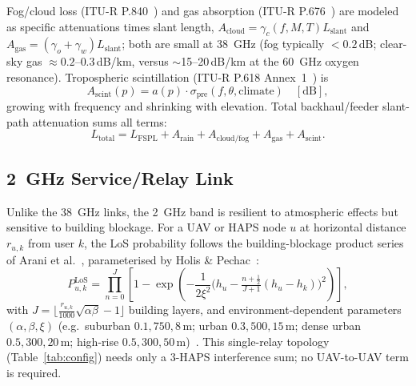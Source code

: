\documentclass[]{ieeeaccess}
\begin{document}
Fog/cloud loss (ITU-R P.840~\cite{itu_p840}) and gas absorption (ITU-R P.676~\cite{itu_p676}) are modeled as specific attenuations times slant length, $A_\mathrm{cloud}=\gamma_c(f,M,T)L_\mathrm{slant}$ and $A_\mathrm{gas}=(\gamma_o+\gamma_w)L_\mathrm{slant}$; both are small at 38~GHz (fog typically $<0.2$\,dB; clear-sky gas $\approx0.2$--$0.3$\,dB/km, versus $\sim$15--20\,dB/km at the 60~GHz oxygen resonance). Tropospheric scintillation (ITU-R P.618 Annex~1~\cite{itu_p618}) is
\begin{equation}
A_\mathrm{scint}(p) = a(p)\cdot\sigma_\mathrm{pre}(f,\theta,\mathrm{climate}) \quad [\mathrm{dB}],
\label{eq:scint_loss}
\end{equation}
growing with frequency and shrinking with elevation. Total backhaul/feeder slant-path attenuation sums all terms:
\begin{equation}
L_\mathrm{total} = L_\mathrm{FSPL} + A_\mathrm{rain} + A_\mathrm{cloud/fog} + A_\mathrm{gas} + A_\mathrm{scint}.
\label{eq:feeder_loss}
\end{equation}

\subsection{2~GHz Service/Relay Link}
\label{subsec:service-model}

Unlike the 38~GHz links, the 2~GHz band is resilient to atmospheric effects but sensitive to building blockage. For a UAV or HAPS node $u$ at horizontal distance $r_{u,k}$ from user $k$, the LoS probability follows the building-blockage product series of Arani et al.~\cite{arani2023}, parameterised by Holis \& Pechac~\cite{holispechac2008}:
\begin{equation}
P^\mathrm{LoS}_{u,k} = \prod_{n=0}^{J}\left[1-\exp\!\left(-\frac{1}{2\xi^2}\Big(h_u-\tfrac{n+\frac12}{J+1}(h_u-h_k)\Big)^{2}\right)\right],
\label{eq:los}
\end{equation}
with $J=\lfloor \tfrac{r_{u,k}}{1000}\sqrt{\alpha\beta}-1\rfloor$ building layers, and environment-dependent parameters $(\alpha,\beta,\xi)$ (e.g.\ suburban $0.1,750,8$\,m; urban $0.3,500,15$\,m; dense urban $0.5,300,20$\,m; high-rise $0.5,300,50$\,m)~\cite{holispechac2008}. This single-relay topology (Table~\ref{tab:config}) needs only a 3-HAPS interference sum; no UAV-to-UAV term is required.
\end{document}
